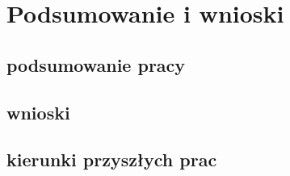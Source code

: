 \chapter{Podsumowanie i wnioski}
\label{chap:wnioski}

\section{podsumowanie pracy}

\section{wnioski}

\section{kierunki przyszłych prac}
